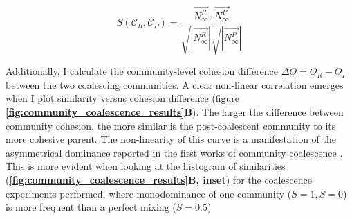 \documentclass[titlepage,11pt]{article}
\begin{document}
\begin{linenumbers}
			\begin{linenomath*}
				\begin{equation}
					S(\mathcal{C}_R, \mathcal{C}_P) = \frac{\vec{N^R_{\infty}} \cdot \vec{N^P_{\infty}}}{\sqrt{|\vec{N^R_{\infty}}|}\sqrt{|\vec{N^P_{\infty}}|}}
				\end{equation}
			\end{linenomath*}
			Additionally, I calculate the community-level cohesion difference $ \Delta \Theta = \Theta_R - \Theta_I$ between the two coalescing communities. A clear non-linear correlation emerges when I plot similarity versus cohesion difference (figure \textbf{\ref{fig:community_coalescence_results}B}). The larger the difference between community cohesion, the more similar is the post-coalescent community to its more cohesive parent. The non-linearity of this curve is a manifestation of the asymmetrical dominance reported in the first works of community coalescence \citep{Gilpin1994}. This is more evident when looking at the histogram of similarities (\textbf{\ref{fig:community_coalescence_results}B, inset}) for the coalescence experiments performed, where monodominance of one community ($ S = 1, S = 0 $) is more frequent than a perfect mixing ($ S = 0.5 $)

\end{linenumbers}
\end{document}
